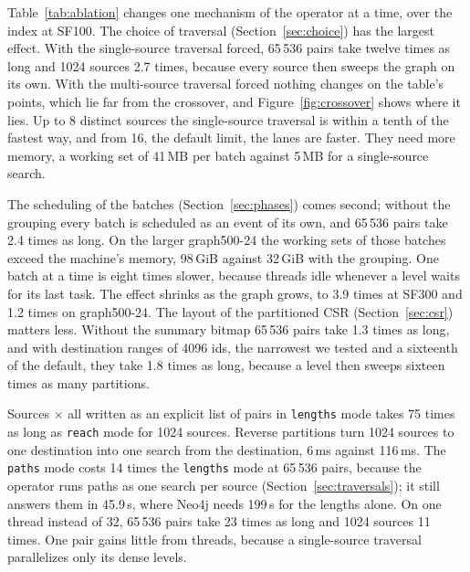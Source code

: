 Table~\ref{tab:ablation} changes one mechanism of the operator at a time, over the index at SF100. The choice of
traversal (Section~\ref{sec:choice}) has the largest effect. With the single-source traversal forced, 65\,536 pairs
take twelve times as long and 1024 sources 2.7 times, because every source then sweeps the graph on its own. With the
multi-source traversal forced nothing changes on the table's points, which lie far from the crossover, and Figure~\ref{fig:crossover} shows where it lies. Up to 8 distinct sources the single-source traversal is within a tenth of the
fastest way, and from 16, the default limit, the lanes are faster. They need more memory, a working set of 41\,MB per batch against 5\,MB for a single-source search.

The scheduling of the batches (Section~\ref{sec:phases}) comes second; without the grouping every batch is
scheduled as an event of its own, and 65\,536 pairs take 2.4 times as long. On the larger graph500-24 the working sets
of those batches exceed the machine's memory, 98\,GiB against 32\,GiB with the grouping. One batch at a time is eight times slower, because threads idle whenever a level waits for its last task. The effect shrinks as the graph grows, to 3.9 times at SF300 and 1.2 times on graph500-24. The layout of the partitioned CSR
(Section~\ref{sec:csr}) matters less. Without the summary bitmap 65\,536 pairs take 1.3 times as long, and with
destination ranges of 4096 ids, the narrowest we tested and a sixteenth of the default, they take 1.8 times as long,
because a level then sweeps sixteen times as many partitions.

Sources $\times$ all written as an explicit list of pairs in \texttt{lengths} mode takes 75 times as long as
\texttt{reach} mode for 1024 sources. Reverse partitions turn 1024 sources to one destination into one search from the
destination, 6\,ms against 116\,ms. The \texttt{paths} mode costs 14 times the \texttt{lengths} mode at 65\,536 pairs,
because the operator runs paths as one search per source (Section~\ref{sec:traversals}); it still answers them in
45.9\,s, where Neo4j needs 199\,s for the lengths alone. On one thread instead of 32, 65\,536 pairs take 23 times as
long and 1024 sources 11 times. One pair gains little from threads, because a single-source traversal parallelizes only
its dense levels.
